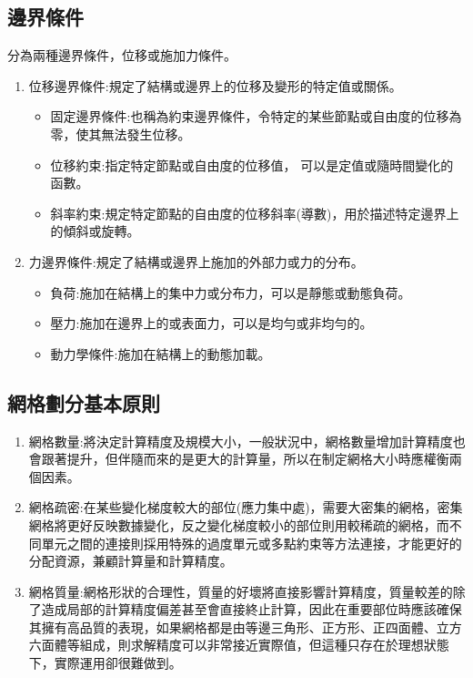 \subsection{邊界條件}
分為兩種邊界條件，位移或施加力條件。

\begin{enumerate}
\item 位移邊界條件:規定了結構或邊界上的位移及變形的特定值或關係。

\begin{itemize}
\item 固定邊界條件:也稱為約束邊界條件，令特定的某些節點或自由度的位移為零，使其無法發生位移。
\item 位移約束:指定特定節點或自由度的位移值， 可以是定值或隨時間變化的函數。
\item 斜率約束:規定特定節點的自由度的位移斜率(導數)，用於描述特定邊界上的傾斜或旋轉。
\end{itemize}

\item 力邊界條件:規定了結構或邊界上施加的外部力或力的分布。

\begin{itemize}
\item 負荷:施加在結構上的集中力或分布力，可以是靜態或動態負荷。
\item 壓力:施加在邊界上的或表面力，可以是均勻或非均勻的。
\item 動力學條件:施加在結構上的動態加載。\\
\end{itemize}
\end{enumerate}

\subsection{網格劃分基本原則}

\begin{enumerate}
\item 網格數量:將決定計算精度及規模大小，一般狀況中，網格數量增加計算精度也會跟著提升，但伴隨而來的是更大的計算量，所以在制定網格大小時應權衡兩個因素。
\item 網格疏密:在某些變化梯度較大的部位(應力集中處)，需要大密集的網格，密集網格將更好反映數據變化，反之變化梯度較小的部位則用較稀疏的網格，而不同單元之間的連接則採用特殊的過度單元或多點約束等方法連接，才能更好的分配資源，兼顧計算量和計算精度。
\item 網格質量:網格形狀的合理性，質量的好壞將直接影響計算精度，質量較差的除了造成局部的計算精度偏差甚至會直接終止計算，因此在重要部位時應該確保其擁有高品質的表現，如果網格都是由等邊三角形、正方形、正四面體、立方六面體等組成，則求解精度可以非常接近實際值，但這種只存在於理想狀態下，實際運用卻很難做到。
\end{enumerate}

